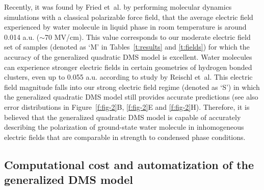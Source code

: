 \documentclass[aip,jcp,preprint,amsmath,amssymb,floatfix]{revtex4-1}
\begin{document}
Recently, it was found by Fried et~al. by performing molecular dynamics simulations with a classical 
polarizable force field, that the average electric field experienced by water molecule in liquid phase
in room temperature is around 0.014 a.u. ($\sim$70 MV/cm).\cite{Fried.Wang.Boxer.Ren.Pande.JPCB.2013}
This value corresponds to our moderate electric field set of samples (denoted as `M' in Tables~\ref{t:results}
and \ref{t:fields}) for which the
accuracy of the generalized quadratic DMS model is excellent.
Water molecules can experience
stronger electric fields in certain geometries of hydrogen bonded clusters, 
even up to 0.055 a.u. according to study by Reischl et~al.\cite{Reischl.Kofinger.Dellago.MolPhys.2009} 
This electric field magnitude falls into our strong electric field regime (denoted as `S')
in which the generalized quadratic DMS model still provides accurate predictions (see also error distributions 
in Figure~\ref{f:fig-2}B, \ref{f:fig-2}E and \ref{f:fig-2}H). Therefore, it is believed that
the generalized quadratic DMS model is capable of accurately describing 
the polarization of ground\hyp{}state water molecule in inhomogeneous 
electric fields that are comparable in strength to condensed phase conditions.

\subsection{\label{s:computational-cost}Computational cost and automatization of the generalized DMS model}
\end{document}
